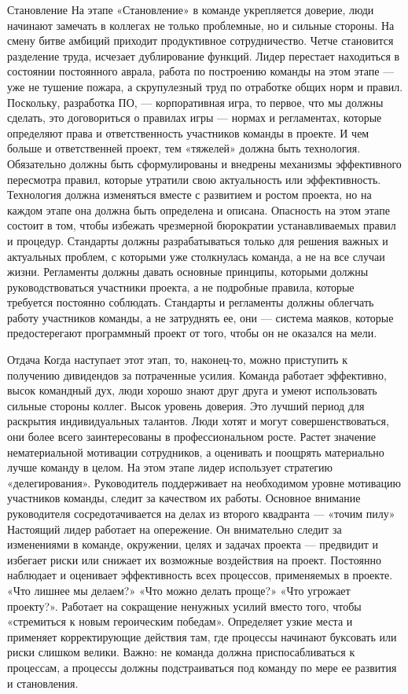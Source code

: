 \documentclass{../industrial-development}
\begin{document}
Становление
На этапе «Становление» в команде укрепляется доверие, люди начинают замечать в коллегах не только проблемные, но и сильные стороны. На смену битве амбиций приходит продуктивное сотрудничество. Четче становится разделение труда, исчезает дублирование функций. Лидер перестает находиться в состоянии постоянного аврала, работа по построению команды на этом этапе — уже не тушение пожара, а скрупулезный труд по отработке общих норм и правил.
Поскольку, разработка ПО, — корпоративная игра, то первое, что мы должны сделать, это договориться о правилах игры — нормах и регламентах, которые определяют права и ответственность участников команды в проекте. И чем больше и ответственней проект, тем «тяжелей» должна быть технология. Обязательно должны быть сформулированы и внедрены механизмы эффективного пересмотра правил, которые утратили свою актуальность или эффективность. Технология должна изменяться вместе с развитием и ростом проекта, но на каждом этапе она должна быть определена и описана.
Опасность на этом этапе состоит в том, чтобы избежать чрезмерной бюрократии устанавливаемых правил и процедур. Стандарты должны разрабатываться только для решения важных и актуальных проблем, с которыми уже столкнулась команда, а не на все случаи жизни. Регламенты должны давать основные принципы, которыми должны руководствоваться участники проекта, а не подробные правила, которые требуется постоянно соблюдать. Стандарты и регламенты должны облегчать работу участников команды, а не затруднять ее, они — система маяков, которые предостерегают программный проект от того, чтобы он не оказался на мели.

Отдача
Когда наступает этот этап, то, наконец-то, можно приступить к получению дивидендов за потраченные усилия. Команда работает эффективно, высок командный дух, люди хорошо знают друг друга и умеют использовать сильные стороны коллег. Высок уровень доверия. Это лучший период для раскрытия индивидуальных талантов. Люди хотят и могут совершенствоваться, они более всего заинтересованы в профессиональном росте. Растет значение нематериальной мотивации сотрудников, а оценивать и поощрять материально лучше команду в целом.
На этом этапе лидер использует стратегию «делегирования». Руководитель поддерживает на необходимом уровне мотивацию участников команды, следит за качеством их работы. Основное внимание руководителя сосредотачивается на делах из второго квадранта — «точим пилу» Настоящий лидер работает на опережение. Он внимательно следит за изменениями в команде, окружении, целях и задачах проекта — предвидит и избегает риски или снижает их возможные воздействия на проект. Постоянно наблюдает и оценивает эффективность всех процессов, применяемых в проекте. «Что лишнее мы делаем?» «Что можно делать проще?» «Что угрожает проекту?». Работает на сокращение ненужных усилий вместо того, чтобы «стремиться к новым героическим победам». Определяет узкие места и применяет корректирующие действия там, где процессы начинают буксовать или риски слишком велики. Важно: не команда должна приспосабливаться к процессам, а процессы должны подстраиваться под команду по мере ее развития и становления.
\end{document}
